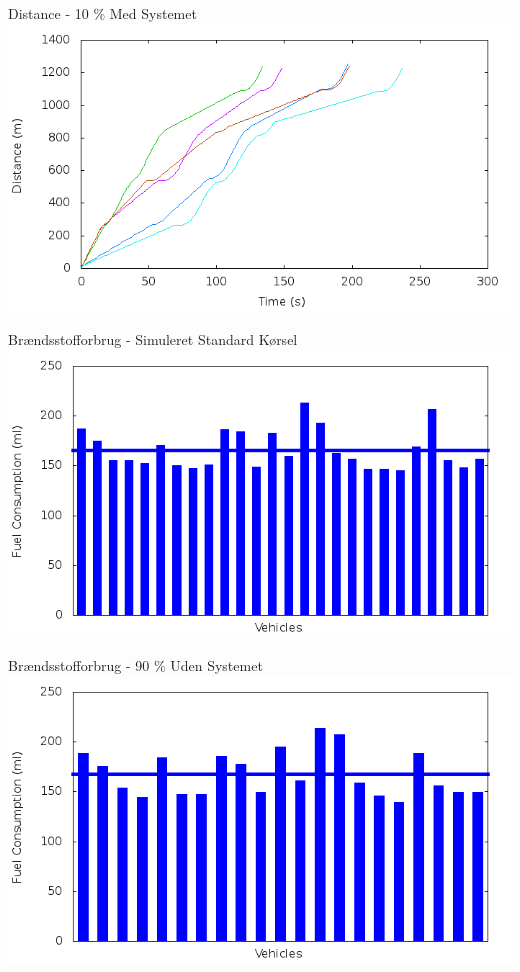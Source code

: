 \begin{frame}{Distance - 10 \% Med Systemet}
\includegraphics[width=1\textwidth]{images/distanceControlled10.png}
\end{frame}

\begin{frame}{Brændsstofforbrug - Simuleret Standard Kørsel}
\includegraphics[width=1\textwidth]{images/fuelRouteUncontrolled0.png}
\end{frame}


\begin{frame}{Brændsstofforbrug - 90 \% Uden Systemet}
\includegraphics[width=1\textwidth]{images/fuelRouteUncontrolled10.png}
\end{frame}


